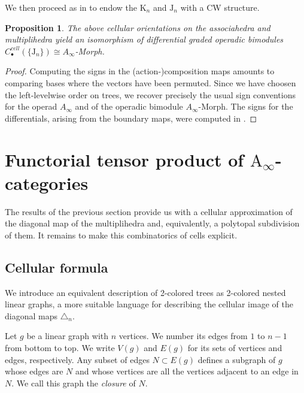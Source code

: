 \documentclass[twoside, 12pt]{amsart}
\newtheorem{proposition}[definition]{Proposition}
\theoremstyle{remark}
\newcommand{\K}{\mathrm{K}}
\newcommand{\J}{\mathrm{J}}
\begin{document}
We then proceed as in \cite[Proposition 4.22]{LA21} to endow the $\K_n$ and $\J_n$ with a CW structure. 

\begin{proposition} \label{prop:functoriality}
The above cellular orientations on the associahedra and multiplihedra yield an isomorphism of differential graded operadic bimodules $C_\bullet^{cell}(\{\J_n\})\cong A_\infty$-Morph.
\end{proposition}

\begin{proof}
Computing the signs in the (action-)composition maps amounts to comparing bases where the vectors have been permuted. Since we have choosen the left-levelwise order on trees, we recover precisely the usual sign conventions for the operad $A_\infty$ and of the operadic bimodule $A_\infty$-Morph.
The signs for the differentials, arising from the boundary maps, were computed in \cite[I, Section 4]{Mazuir21}.
\end{proof}



\section{Functorial tensor product of $\mathrm{A}_\infty$-categories}

The results of the previous section provide us with a cellular approximation of the diagonal map of the multiplihedra and, equivalently, a polytopal subdivision of them. It remains to make this combinatorics of cells explicit. 


\subsection{Cellular formula}

We introduce an equivalent description of 2-colored trees as 2-colored nested linear graphs, a more suitable language for describing the cellular image of the diagonal maps $\triangle_n$. 

Let $g$ be a linear graph with $n$ vertices. 
We number its edges from $1$ to $n-1$ from bottom to top. 
We write $V(g)$ and $E(g)$ for its sets of vertices and edges, respectively.
Any subset of edges $N\subset E(g)$ defines a subgraph of $g$ whose edges are $N$ and whose vertices are all the vertices adjacent to an edge in $N$. 
We call this graph the \emph{closure} of $N$. 
\end{document}
